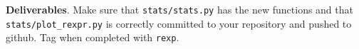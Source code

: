 \begin{fullwidth}


\begin{callout}{\bcplume}
{\bf Deliverables}. Make sure that {\tt stats/stats.py} has the new functions and that {\tt stats/plot\_rexpr.py} is correctly committed to your repository and pushed to github. Tag when completed with {\tt rexp}.
\end{callout}

\end{fullwidth}
